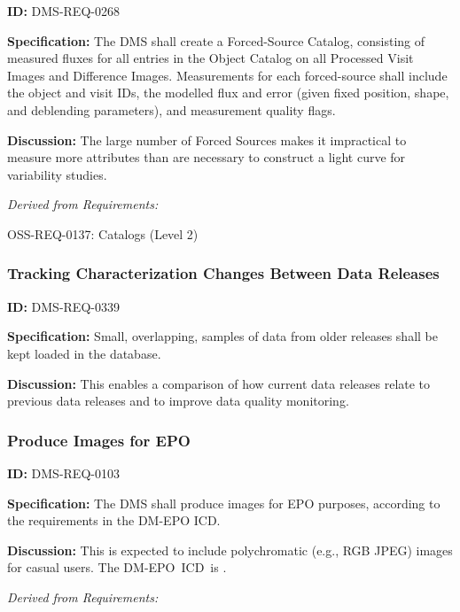 \documentclass[SE,toc,lsstdraft]{lsstdoc}
\begin{document}
\label{DMS-REQ-0268}
\textbf{ID:} DMS-REQ-0268

\textbf{Specification:} The DMS shall create a Forced-Source Catalog, consisting of measured fluxes for all entries in the Object Catalog on all Processed Visit Images and Difference Images. Measurements for each forced-source shall include the object and visit IDs, the modelled flux and error (given fixed position, shape, and deblending parameters), and measurement quality flags.

\textbf{Discussion: }The large number of Forced Sources makes it impractical to measure more attributes than are necessary to construct a light curve for variability studies.




\emph{Derived from Requirements:}

OSS-REQ-0137:
Catalogs (Level 2) \newline


\subsubsection{Tracking Characterization Changes Between Data Releases}

\label{DMS-REQ-0339}
\textbf{ID:} DMS-REQ-0339

\textbf{Specification:} Small, overlapping, samples of data from older releases shall be kept loaded in the database.

\textbf{Discussion: }This enables a comparison of how current data releases relate to previous data releases and to improve data quality monitoring.




\subsubsection{Produce Images for EPO}

\label{DMS-REQ-0103}
\textbf{ID:} DMS-REQ-0103

    \textbf{Specification:} The DMS shall produce images for EPO purposes, according to the requirements in the DM-EPO ICD.

    \textbf{Discussion: }This is expected to include polychromatic (e.g., RGB JPEG) images for casual users. The DM-EPO ICD is .









\emph{Derived from Requirements:}
\end{document}
